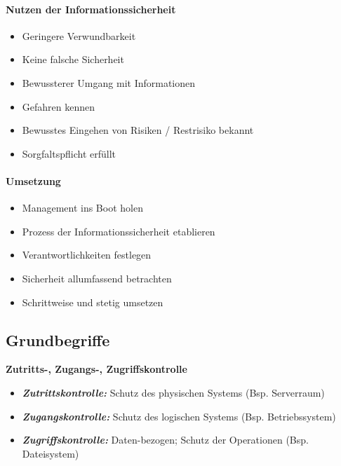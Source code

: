 \documentclass[10pt,a4paper]{article}
\begin{document}
\paragraph*{Nutzen der Informationssicherheit}
\begin{itemize}[noitemsep,topsep=0pt,leftmargin=*]
    \item Geringere Verwundbarkeit
    \item Keine falsche Sicherheit
    \item Bewussterer Umgang mit Informationen
    \item Gefahren kennen
    \item Bewusstes Eingehen von Risiken / Restrisiko bekannt
    \item Sorgfaltspflicht erfüllt
\end{itemize}

\paragraph*{Umsetzung}
\begin{itemize}[noitemsep,topsep=0pt,leftmargin=*]
    \item Management ins Boot holen
    \item Prozess der Informationssicherheit etablieren
    \item Verantwortlichkeiten festlegen
    \item Sicherheit allumfassend betrachten
    \item Schrittweise und stetig umsetzen
\end{itemize}


\subsection*{Grundbegriffe}\label{sec:Grundbegriffe}
\textbf{Zutritts-, Zugangs-, Zugriffskontrolle}
\begin{itemize}[noitemsep,topsep=0pt,leftmargin=*]
    \item \textbf{\textsl{Zutrittskontrolle: }}Schutz des physischen Systems (Bsp. Serverraum)
    \item \textbf{\textsl{Zugangskontrolle: }}Schutz des logischen Systems (Bsp. Betriebssystem)
    \item \textbf{\textsl{Zugriffskontrolle: }}Daten-bezogen; Schutz der Operationen (Bsp. Dateisystem)
\end{itemize}
\end{document}

